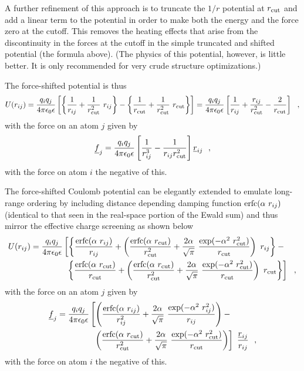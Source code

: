 A further refinement of this approach is to truncate the $1/r$
potential at $r_{\rm cut}$ and add a linear term to the potential
in order to make both the energy and the force zero at the cutoff.
This removes the heating effects that arise from the discontinuity
in the forces at the cutoff in the simple truncated and shifted
potential (the formula above).  (The physics of this potential,
however, is little better.  It is only recommended for very crude
structure optimizations.)

The force-shifted potential is thus
\begin{equation}
U(r_{ij}) = {q_{i} q_{j} \over 4\pi\epsilon_{0}\epsilon}
\left[ \left\{\frac{1}{r_{ij}}+\frac{1}{r_{\rm cut}^{2}}~r_{ij}\right\} -
\left\{\frac{1}{r_{\rm cut}}+\frac{1}{r_{\rm cut}^{2}}~r_{\rm cut}\right\} \right]
= {q_{i} q_{j} \over 4\pi\epsilon_{0}\epsilon}
\left[ \frac{1}{r_{ij}} + \frac{r_{ij}}{r_{\rm cut}^{2}} - \frac{2}{r_{\rm cut}} \right]~~,
\end{equation}
with the force on an atom $j$ given by
\begin{equation}
\mbox{$\underline{f}$}_{j} = \frac{q_{i}q_{j}}{4\pi\epsilon_{0}\epsilon}
\left[ \frac{1} {r_{ij}^{3}} - \frac{1}{r_{ij}r_{\rm cut}^{2}} \right] \mbox{$\underline{r}$}_{ij}~~,
\end{equation}
with the force on atom $i$ the negative of this.

The force-shifted Coulomb potential can be elegantly extended to
emulate long-range ordering by including distance depending damping
function ${\rm erfc}(\alpha~r_{ij})$ (identical to that seen in the
real-space portion of the Ewald sum) and thus mirror the effective
charge screening \cite{fennell-06a} as shown below
\begin{eqnarray}
U(r_{ij}) = {q_{i} q_{j} \over 4\pi\epsilon_{0}\epsilon} \left[
\left\{ \frac{{\rm erfc}(\alpha~r_{ij})}{r_{ij}} + \left(\frac{{\rm erfc}(\alpha~r_{\rm cut})}{r_{\rm cut}^{2}}+
\frac{2\alpha}{\sqrt{\pi}}~\frac{\exp(-\alpha^{2}~r_{\rm cut}^{2})}{r_{\rm cut}}\right)~r_{ij}\right\} - \phantom{xx} \right. \nonumber \\
\left. \left\{ \frac{{\rm erfc}(\alpha~r_{\rm cut})}{r_{\rm cut}} + \left(\frac{{\rm erfc}(\alpha~r_{\rm cut})}{r_{\rm cut}^{2}}+
\frac{2\alpha}{\sqrt{\pi}}~\frac{\exp(-\alpha^{2}~r_{\rm cut}^{2})}{r_{\rm cut}}\right)~r_{\rm cut}\right\} \right]~~,
\end{eqnarray}
with the force on an atom $j$ given by
\begin{eqnarray}
\mbox{$\underline{f}$}_{j} = {q_{i} q_{j} \over 4\pi\epsilon_{0}\epsilon} \left[ \left( \frac{{\rm erfc}(\alpha~r_{ij})}{r_{ij}^{2}} +
\frac{2\alpha}{\sqrt{\pi}}~\frac{\exp(-\alpha^{2}~r_{ij}^{2})}{r_{ij}} \right) - \phantom{xxxxx} \right. \nonumber \\
\left. \left( \frac{{\rm erfc}(\alpha~r_{\rm cut})}{r_{\rm cut}^{2}} +
\frac{2\alpha}{\sqrt{\pi}}~\frac{\exp(-\alpha^{2}~r_{\rm cut}^{2})}{r_{\rm cut}} \right) \right]~\frac{\mbox{$\underline{r}$}_{ij}}{r_{ij}}~~,
\end{eqnarray}
with the force on atom $i$ the negative of this.

